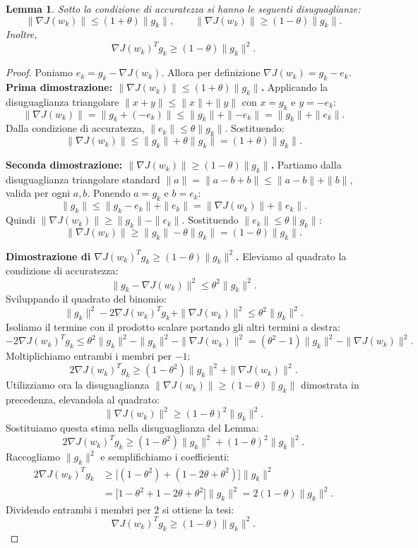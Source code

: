 \documentclass[a4paper,12pt]{article}
\numberwithin{equation}{section}
\numberwithin{figure}{section}
\numberwithin{table}{section}
\newtheorem{lemma}{Lemma}
\begin{document}
\begin{lemma}\label{lem:accuratezza}
  Sotto la condizione di accuratezza si hanno le seguenti disuguaglianze:
  \[
  \|\nabla J(w_k)\| \leq (1+\theta)\|g_k\|, \qquad
  \|\nabla J(w_k)\| \geq (1-\theta)\|g_k\|.
  \]
  Inoltre,
  \[
  \nabla J(w_k)^T g_k \geq (1-\theta)\|g_k\|^2.
  \]
\end{lemma}
\begin{proof}
  Poniamo $e_k = g_k - \nabla J(w_k)$. Allora per definizione $\nabla J(w_k) = g_k - e_k$.
  \textbf{Prima dimostrazione: $\|\nabla J(w_k)\| \leq (1+\theta)\|g_k\|$.}
  Applicando la disuguaglianza triangolare $\|x+y\| \leq \|x\| + \|y\|$ con $x = g_k$ e $y = -e_k$:
  \[
  \|\nabla J(w_k)\| = \|g_k + (-e_k)\| \leq \|g_k\| + \|{-e_k}\| = \|g_k\| + \|e_k\|.
  \]
  Dalla condizione di accuratezza, $\|e_k\| \leq \theta \|g_k\|$. Sostituendo:
  \[
  \|\nabla J(w_k)\| \leq \|g_k\| + \theta \|g_k\| = (1+\theta)\|g_k\|.
  \]

  \textbf{Seconda dimostrazione: $\|\nabla J(w_k)\| \geq (1-\theta)\|g_k\|$.}
  Partiamo dalla disuguaglianza triangolare standard $\|a\|=\|a-b+b\| \leq \|a-b\| + \|b\|$, valida per ogni $a,b$. Ponendo $a = g_k$ e $b = e_k$:
  \[
  \|g_k\| \leq \|g_k - e_k\| + \|e_k\| = \|\nabla J(w_k)\| + \|e_k\|.
  \]
  Quindi $\|\nabla J(w_k)\| \geq \|g_k\| - \|e_k\|$. Sostituendo $\|e_k\| \leq \theta \|g_k\|$:
  \[
  \|\nabla J(w_k)\| \geq \|g_k\| - \theta \|g_k\| = (1-\theta)\|g_k\|.
  \]

  \textbf{Dimostrazione di $\nabla J(w_k)^T g_k \geq (1-\theta)\|g_k\|^2$.}
  Eleviamo al quadrato la condizione di accuratezza:
  \[
  \|g_k - \nabla J(w_k)\|^2 \leq \theta^2 \|g_k\|^2.
  \]
  Sviluppando il quadrato del binomio:
  \[
  \|g_k\|^2 - 2\nabla J(w_k)^T g_k + \|\nabla J(w_k)\|^2 \leq \theta^2 \|g_k\|^2.
  \]
  Isoliamo il termine con il prodotto scalare portando gli altri termini a destra:
  \[
  -2\nabla J(w_k)^T g_k \leq \theta^2 \|g_k\|^2 - \|g_k\|^2 - \|\nabla J(w_k)\|^2 = (\theta^2 - 1)\|g_k\|^2 - \|\nabla J(w_k)\|^2.
  \]
  Moltiplichiamo entrambi i membri per $-1$:
  \[
  2\nabla J(w_k)^T g_k \geq (1 - \theta^2)\|g_k\|^2 + \|\nabla J(w_k)\|^2.
  \]
  Utilizziamo ora la disuguaglianza $\|\nabla J(w_k)\| \geq (1-\theta)\|g_k\|$ dimostrata in precedenza, elevandola al quadrato:
  \[
  \|\nabla J(w_k)\|^2 \geq (1-\theta)^2 \|g_k\|^2.
  \]
  Sostituiamo questa stima nella disuguaglianza del Lemma:
  \[
  2\nabla J(w_k)^T g_k \geq (1 - \theta^2)\|g_k\|^2 + (1-\theta)^2 \|g_k\|^2.
  \]
  Raccogliamo $\|g_k\|^2$ e semplifichiamo i coefficienti:
  \[
  \begin{aligned}
  2\nabla J(w_k)^T g_k
  &\geq \bigl[(1 - \theta^2) + (1 - 2\theta + \theta^2)\bigr] \|g_k\|^2 \\
  &= \bigl[1 - \theta^2 + 1 - 2\theta + \theta^2\bigr] \|g_k\|^2
   = 2(1 - \theta) \|g_k\|^2.
  \end{aligned}
  \]
  Dividendo entrambi i membri per $2$ si ottiene la tesi:
  \[
  \nabla J(w_k)^T g_k \geq (1-\theta) \|g_k\|^2.
  \]
\end{proof}
\end{document}
